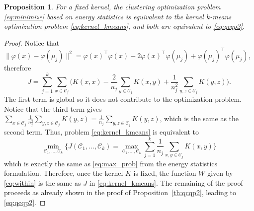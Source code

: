 \documentclass[aps,preprint,nofootinbib,floatfix]{revtex4-1}
\newtheorem{proposition}[theorem]{Proposition}
\newcommand\kk{K}
\newcommand\C{{\mathcal{C}}}
\begin{document}
\begin{proposition}
\label{th:kernel_kmeans}
For a fixed kernel,
the clustering optimization problem
\eqref{eq:minimize} based on energy statistics 
is equivalent to the kernel $k$-means optimization problem
\eqref{eq:kernel_kmeans}, and both are equivalent to \eqref{eq:qcqp2}.
\end{proposition}
\begin{proof}
Notice that $\| \varphi(x) - \varphi(\mu_j) \|^2 = \varphi(x)^\top \varphi(x)
- 2 \varphi(x)^\top \varphi(\mu_j) + \varphi(\mu_j)^\top \varphi(\mu_j)$,
therefore
\begin{equation}
\label{eq:J}
J = \sum_{j=1}^k \sum_{x\in\C_j} \bigg(
\kk(x,x) - 
\dfrac{2}{n_j} \sum_{y\in \C_j} \kk(x,y) + \dfrac{1}{n_j^2}
\sum_{y,z \in \C_j} \kk(y,z) \bigg).
\end{equation}
The first term is global so it does not contribute to the optimization
problem. Notice that the third term gives
$\sum_{x\in\C_j} \tfrac{1}{n_j^2} \sum_{y,z\in\C_j} \kk(y,z) =
\tfrac{1}{n_j}\sum_{y,z\in\C_j} \kk(y,z)$, which is the same as
the second term. Thus, problem
\eqref{eq:kernel_kmeans} is equivalent to
\begin{equation}
\min_{\C_1,\dotsc,\C_k} \bigg\{ J(\C_1,\dotsc,\C_k) = \max_{\C_1,\dotsc,\C_k}
\sum_{j=1}^k \dfrac{1}{n_j} \sum_{x,y \in\C_j} \kk(x,y) \bigg\}
\end{equation}
which is exactly the same as 
\eqref{eq:max_prob} from the energy statistics formulation. Therefore,
once the kernel $\kk$ is fixed, the function 
$W$ given by \eqref{eq:within} is the same
as $J$ in \eqref{eq:kernel_kmeans}.
The remaining of the proof proceeds as 
already shown in the proof of Proposition~\ref{th:qcqp2}, leading to
\eqref{eq:qcqp2}.
\end{proof}
\end{document}
